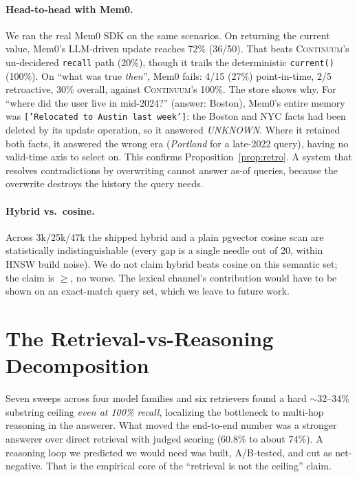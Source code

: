 \documentclass[11pt]{article}
\newcommand{\code}[1]{\texttt{#1}}
\begin{document}
\paragraph{Head-to-head with Mem0.} We ran the real Mem0 SDK on the same scenarios. On returning
the current value, Mem0's LLM-driven update reaches 72\% (36/50). That beats \textsc{Continuum}'s
un-decidered \code{recall} path (20\%), though it trails the deterministic \code{current()} (100\%).
On ``what was true \emph{then}'', Mem0 fails: 4/15 (27\%) point-in-time, 2/5 retroactive, 30\%
overall, against \textsc{Continuum}'s 100\%. The store shows why. For ``where did the user live in
mid-2024?'' (answer: Boston), Mem0's entire memory was \texttt{['Relocated to Austin last week']}:
the Boston and NYC facts had been deleted by its update operation, so it answered \emph{UNKNOWN}.
Where it retained both facts, it answered the wrong era (\emph{Portland} for a late-2022 query),
having no valid-time axis to select on. This confirms Proposition~\ref{prop:retro}. A system that
resolves contradictions by overwriting cannot answer as-of queries, because the overwrite destroys
the history the query needs.

\paragraph{Hybrid vs.\ cosine.} Across 3k/25k/47k the shipped hybrid and a plain pgvector cosine
scan are statistically indistinguishable (every gap is a single needle out of 20, within HNSW build
noise). We do not claim hybrid beats cosine on this semantic set; the claim is $\ge$, no worse. The
lexical channel's contribution would have to be shown on an exact-match query set, which we leave to
future work.

\section{The Retrieval-vs-Reasoning Decomposition}

Seven sweeps across four model families and six retrievers found a hard $\sim$32--34\% substring
ceiling \emph{even at 100\% recall}, localizing the bottleneck to multi-hop reasoning in the
answerer. What moved the end-to-end number was a stronger answerer over direct retrieval with judged
scoring (60.8\% to about 74\%). A reasoning loop we predicted we would need was built, A/B-tested,
and cut as net-negative. That is the empirical core of the ``retrieval is not the ceiling'' claim.
\end{document}
